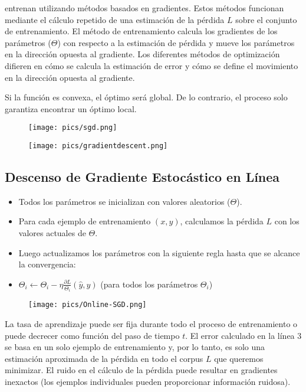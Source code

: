 entrenan utilizando métodos basados en gradientes. Estos métodos funcionan mediante el cálculo repetido de una estimación de la pérdida $L$ sobre el conjunto de entrenamiento. El método de entrenamiento calcula los gradientes de los parámetros ($\Theta$) con respecto a la estimación de pérdida y mueve los parámetros en la dirección opuesta al gradiente. Los diferentes métodos de optimización difieren en cómo se calcula la estimación de error y cómo se define el movimiento en la dirección opuesta al gradiente.

Si la función es convexa, el óptimo será global. De lo contrario, el proceso solo garantiza encontrar un óptimo local.

\begin{figure}[htb]
	\centering
	 \texttt{[image: pics/sgd.png]}
\end{figure}

\begin{figure}[htb]
	\centering
	 \texttt{[image: pics/gradientdescent.png]}
\end{figure}

\subsection{Descenso de Gradiente Estocástico en Línea}
\begin{itemize}
\item Todos los parámetros se inicializan con valores aleatorios ($\Theta$).
\item Para cada ejemplo de entrenamiento $(x,y)$, calculamos la pérdida $L$ con los valores actuales de $\Theta$.
\item Luego actualizamos los parámetros con la siguiente regla hasta que se alcance la convergencia:
\item $\Theta_i \leftarrow \Theta_i - \eta \frac{\partial L}{\Theta_i}(\hat{y},y)$ (para todos los parámetros $\Theta_i$)
\end{itemize}

\begin{figure}[htb]
	\centering
	 \texttt{[image: pics/Online-SGD.png]}
\end{figure}

La tasa de aprendizaje puede ser fija durante todo el proceso de entrenamiento o puede decrecer como función del paso de tiempo $t$. El error calculado en la línea 3 se basa en un solo ejemplo de entrenamiento y, por lo tanto, es solo una estimación aproximada de la pérdida en todo el corpus $L$ que queremos minimizar. El ruido en el cálculo de la pérdida puede resultar en gradientes inexactos (los ejemplos individuales pueden proporcionar información ruidosa).

